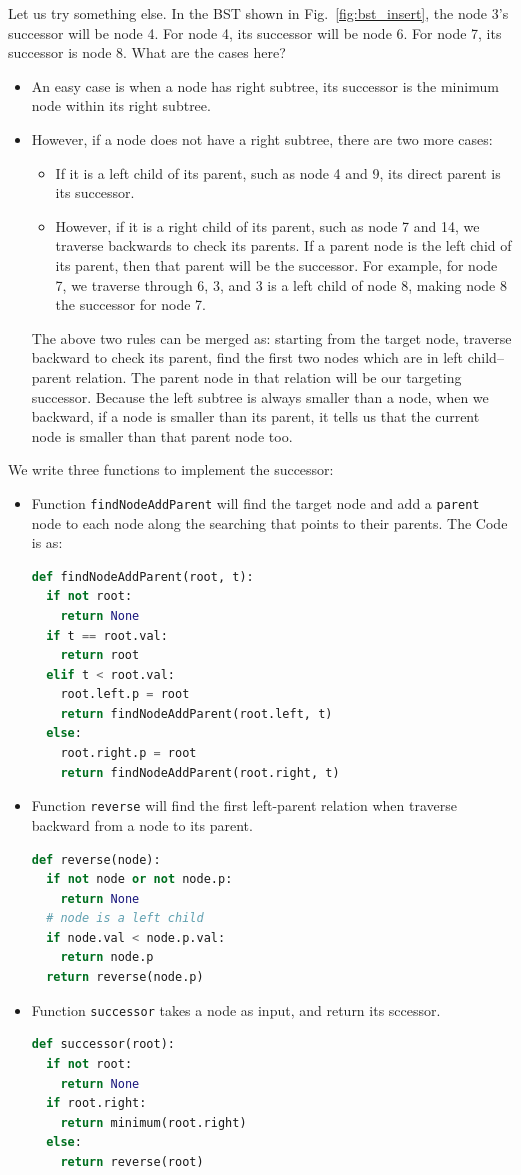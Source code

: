 \documentclass[main.tex]{subfiles}
\begin{document}
Let us try something else. In the BST shown in Fig.~\ref{fig:bst_insert}, the node 3's successor will be node 4. For node 4, its successor will be node 6. For node 7, its successor is node 8. What are the cases here?
\begin{itemize}
    \item An easy case is when a node has right subtree, its successor is the minimum node within its right subtree.
    \item However, if a node does not have a right subtree, there are two more cases: 
    \begin{itemize}
        \item If it is a left child of its parent, such as node 4 and 9, its direct parent is its successor.
        \item However, if it is a right child of its parent, such as node 7 and 14, we traverse backwards to check its parents. If a parent node is the left chid of its parent, then that parent will be the successor. For example, for node 7, we traverse through 6, 3, and 3 is a left child of node 8, making node 8 the successor for node 7.  
    \end{itemize}
    The above two rules can be merged as: starting from the target node, traverse backward to check its parent, find the first two  nodes which are in left child--parent relation. The parent node in that relation will be our targeting successor. Because the left subtree is always smaller than a node, when we backward, if a node is smaller than its parent, it tells us that the current node is smaller than that parent node too. 
\end{itemize}
We write three functions to implement the successor: 
\begin{itemize}
    \item Function \texttt{findNodeAddParent} will find the target node and add a \texttt{parent} node to each node along the searching that points to their parents. The Code is as:
\begin{lstlisting}[language=Python]
def findNodeAddParent(root, t):
  if not root:
    return None
  if t == root.val: 
    return root
  elif t < root.val:
    root.left.p = root
    return findNodeAddParent(root.left, t)
  else:
    root.right.p = root
    return findNodeAddParent(root.right, t)
\end{lstlisting}
\item Function \texttt{reverse} will find the first left-parent relation when traverse backward from a node to its parent.
\begin{lstlisting}[language=Python]
def reverse(node):
  if not node or not node.p:
    return None
  # node is a left child
  if node.val < node.p.val:
    return node.p
  return reverse(node.p)
\end{lstlisting}
\item Function \texttt{successor} takes a node as input, and return its sccessor.
\begin{lstlisting}[language=Python]
def successor(root):
  if not root:
    return None
  if root.right:
    return minimum(root.right)
  else:
    return reverse(root) 
\end{lstlisting}
\end{itemize}
\end{document}

